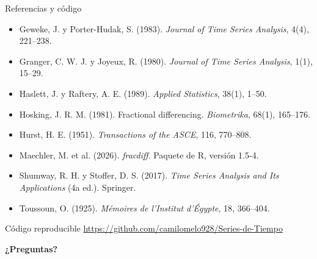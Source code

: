 \documentclass[aspectratio=169,11pt]{beamer}
\newcommand{\destacar}[1]{\textcolor{udeaverde}{\textbf{#1}}}
\begin{document}
\begin{frame}{Referencias y código}
\footnotesize
\begin{itemize}
\item Geweke, J. y Porter-Hudak, S. (1983). \emph{Journal of Time Series Analysis}, 4(4), 221--238.
\item Granger, C. W. J. y Joyeux, R. (1980). \emph{Journal of Time Series Analysis}, 1(1), 15--29.
\item Haslett, J. y Raftery, A. E. (1989). \emph{Applied Statistics}, 38(1), 1--50.
\item Hosking, J. R. M. (1981). Fractional differencing. \emph{Biometrika}, 68(1), 165--176.
\item Hurst, H. E. (1951). \emph{Transactions of the ASCE}, 116, 770--808.
\item Maechler, M. et al. (2026). \emph{fracdiff}. Paquete de R, versión 1.5-4.
\item Shumway, R. H. y Stoffer, D. S. (2017). \emph{Time Series Analysis and Its Applications} (4a ed.). Springer.
\item Toussoun, O. (1925). \emph{Mémoires de l'Institut d'Égypte}, 18, 366--404.
\end{itemize}
\vspace{0.3cm}
\normalsize
\begin{block}{Código reproducible}
\centering \url{https://github.com/camilomelo928/Series-de-Tiempo}
\end{block}
\vspace{0.3cm}
\centering
{\Large \destacar{¿Preguntas?}}
\end{frame}
\end{document}
